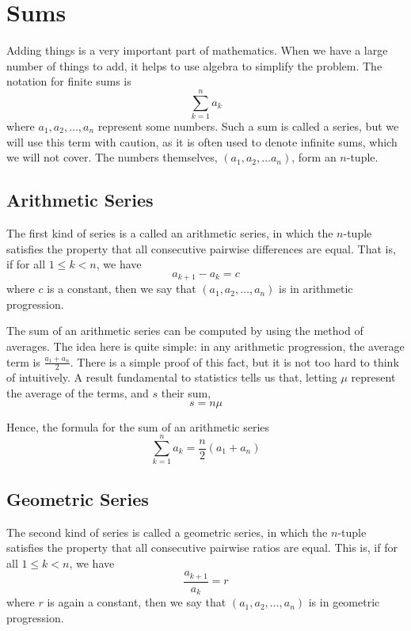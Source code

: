 \documentclass[12pt,a4paper]{report}
\begin{document}
\section{Sums}

Adding things is a very important part of mathematics. When we have a large
number of things to add, it helps to use algebra to simplify the problem. The
notation for finite sums is \[
 \sum_{k = 1}^n a_k
\] where $a_1, a_2, \dots, a_n$ represent some numbers. Such a sum is called a
series, but we will use this term with caution, as it is often used to denote
infinite sums, which we will not cover. The numbers themselves, $(a_1, a_2,
\dots a_n)$, form an $n$-tuple.

\subsection{Arithmetic Series}

The first kind of series is a called an arithmetic series, in which the
$n$-tuple satisfies the property that all consecutive pairwise differences are
equal. That is, if for all $1 \le k < n$, we have \[ a_{k+1} - a_k = c \] where
$c$ is a constant, then we say that $(a_1, a_2, \dots, a_n)$ is in arithmetic
progression.

The sum of an arithmetic series can be computed by using the method of averages.
The idea here is quite simple: in any arithmetic progression, the average term
is $\frac{a_1 + a_n}{2}$. There is a simple proof of this fact, but it is not
too hard to think of intuitively. A result fundamental to statistics tells us
that, letting $\mu$ represent the average of the terms, and $s$ their sum, \[
 s = n \mu
\]

Hence, the formula for the sum of an arithmetic series \begin{equation}
 \sum_{k=1}^n a_k = \frac{n}{2} (a_1 + a_n)
\end{equation}

\subsection{Geometric Series}

The second kind of series is called a geometric series, in which the $n$-tuple
satisfies the property that all consecutive pairwise ratios are equal. This is,
if for all $1 \le k < n$, we have \[ \frac{a_{k+1}}{a_k} = r \] where $r$ is
again a constant, then we say that $(a_1, a_2, \dots, a_n)$ is in geometric
progression.
\end{document}

